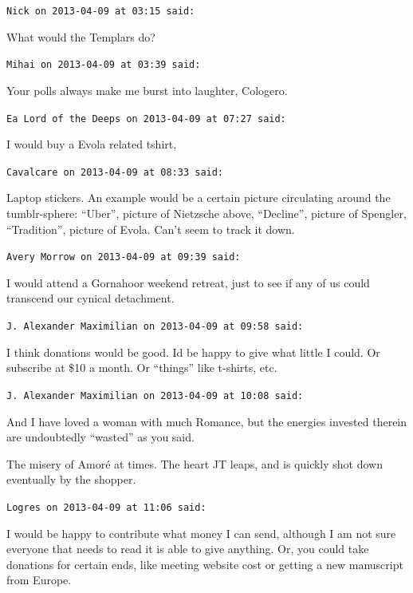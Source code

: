 \begin{footnotesize}
\begin{sffamily}
\texttt{Nick on 2013-04-09 at 03:15 said:}

What would the Templars do?

\hfill

\texttt{Mihai on 2013-04-09 at 03:39 said:}

Your polls always make me burst into laughter, Cologero.

\hfill

\texttt{Ea Lord of the Deeps on 2013-04-09 at 07:27 said:}

I would buy a Evola related tshirt,

\hfill

\texttt{Cavalcare on 2013-04-09 at 08:33 said:}

Laptop stickers. An example would be a certain picture circulating around the tumblr-sphere: ``Uber'', picture of Nietzsche above, ``Decline'', picture of Spengler, ``Tradition'', picture of Evola. Can't seem to track it down.

\hfill

\texttt{Avery Morrow on 2013-04-09 at 09:39 said:}

I would attend a Gornahoor weekend retreat, just to see if any of us could transcend our cynical detachment.

\hfill

\texttt{J. Alexander Maximilian on 2013-04-09 at 09:58 said:}

I think donations would be good. Id be happy to give what little I could. Or subscribe at \$10 a month. Or ``things'' like t-shirts, etc.

\hfill

\texttt{J. Alexander Maximilian on 2013-04-09 at 10:08 said:}

And I have loved a woman with much Romance, but the energies invested therein are undoubtedly ``wasted'' as you said.

The misery of Amoré at times. The heart JT leaps, and is quickly shot down eventually by the shopper.

\hfill

\texttt{Logres on 2013-04-09 at 11:06 said:}

I would be happy to contribute what money I can send, although I am not sure everyone that needs to read it is able to give anything. Or, you could take donations for certain ends, like meeting website cost or getting a new manuscript from Europe.


\end{sffamily}
\end{footnotesize}
